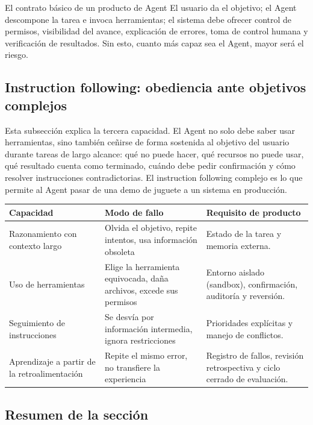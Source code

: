 \documentclass[a4paper]{article}
\begin{document}
\begin{importantbox}{El contrato básico de un producto de Agent}
El usuario da el objetivo; el Agent descompone la tarea e invoca herramientas; el sistema debe ofrecer control de permisos, visibilidad del avance, explicación de errores, toma de control humana y verificación de resultados. Sin esto, cuanto más capaz sea el Agent, mayor será el riesgo.
\end{importantbox}

\subsection{Instruction following: obediencia ante objetivos complejos}

Esta subsección explica la tercera capacidad. El Agent no solo debe saber usar herramientas, sino también ceñirse de forma sostenida al objetivo del usuario durante tareas de largo alcance: qué no puede hacer, qué recursos no puede usar, qué resultado cuenta como terminado, cuándo debe pedir confirmación y cómo resolver instrucciones contradictorias. El instruction following complejo es lo que permite al Agent pasar de una demo de juguete a un sistema en producción.

\noindent\begin{tabularx}{\textwidth}{p{}p{}X}
\toprule
Capacidad & Modo de fallo & Requisito de producto \\
\midrule
Razonamiento con contexto largo & Olvida el objetivo, repite intentos, usa información obsoleta & Estado de la tarea y memoria externa. \\
Uso de herramientas & Elige la herramienta equivocada, daña archivos, excede sus permisos & Entorno aislado (sandbox), confirmación, auditoría y reversión. \\
Seguimiento de instrucciones & Se desvía por información intermedia, ignora restricciones & Prioridades explícitas y manejo de conflictos. \\
Aprendizaje a partir de la retroalimentación & Repite el mismo error, no transfiere la experiencia & Registro de fallos, revisión retrospectiva y ciclo cerrado de evaluación. \\
\bottomrule
\end{tabularx}

\subsection{Resumen de la sección}
\end{document}
